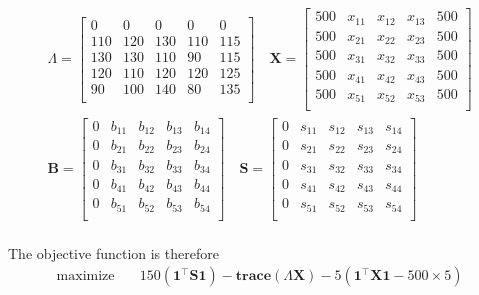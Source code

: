 \begin{align}
  \Lambda = 
  \begin{bmatrix}
    0 & 0 & 0 & 0 & 0 \\
    110 & 120 & 130 & 110 & 115 \\
    130 & 130 & 110 & 90 & 115 \\
    120 & 110 & 120 & 120 & 125 \\
    90 & 100 & 140 & 80 & 135 \\
  \end{bmatrix}
  \quad
  \textbf{X} = 
  \begin{bmatrix}
    500 & x_{11} & x_{12} & x_{13} & 500 \\
    500 & x_{21} & x_{22} & x_{23} & 500 \\
    500 & x_{31} & x_{32} & x_{33} & 500 \\
    500 & x_{41} & x_{42} & x_{43} & 500 \\
    500 & x_{51} & x_{52} & x_{53} & 500 \\
  \end{bmatrix}
  \\
  \textbf{B} = 
  \begin{bmatrix}
    0 & b_{11} & b_{12} & b_{13} & b_{14} \\
    0 & b_{21} & b_{22} & b_{23} & b_{24} \\
    0 & b_{31} & b_{32} & b_{33} & b_{34} \\
    0 & b_{41} & b_{42} & b_{43} & b_{44} \\
    0 & b_{51} & b_{52} & b_{53} & b_{54} \\
  \end{bmatrix}
  \quad
  \textbf{S} = 
  \begin{bmatrix}
    0 & s_{11} & s_{12} & s_{13} & s_{14} \\
    0 & s_{21} & s_{22} & s_{23} & s_{24} \\
    0 & s_{31} & s_{32} & s_{33} & s_{34} \\
    0 & s_{41} & s_{42} & s_{43} & s_{44} \\
    0 & s_{51} & s_{52} & s_{53} & s_{54} \\
  \end{bmatrix}
\end{align}
\\
The objective function is therefore
\begin{align}
  \text{maximize} & \quad 150(\textbf{1}^\top \textbf{S} \textbf{1}) - \textbf{trace}(\Lambda \textbf{X}) - 5 (\textbf{1}^\top \textbf{X} \textbf{1} - 500 \times 5)
\end{align}

